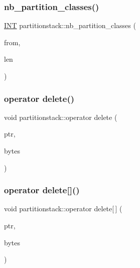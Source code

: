 \subsubsection{\texorpdfstring{nb\+\_\+partition\+\_\+classes()}{nb\_partition\_classes()}}
{\footnotesize\ttfamily \mbox{\hyperlink{galois_8h_a09fddde158a3a20bd2dcadb609de11dc}{I\+NT}} partitionstack\+::nb\+\_\+partition\+\_\+classes (\begin{DoxyParamCaption}\item[{\mbox{\hyperlink{galois_8h_a09fddde158a3a20bd2dcadb609de11dc}{I\+NT}}}]{from,  }\item[{\mbox{\hyperlink{galois_8h_a09fddde158a3a20bd2dcadb609de11dc}{I\+NT}}}]{len }\end{DoxyParamCaption})}

\mbox{\label{classpartitionstack_a18cdc060426cd39c320fccc084427d15}} 
\subsubsection{\texorpdfstring{operator delete()}{operator delete()}}
{\footnotesize\ttfamily void partitionstack\+::operator delete (\begin{DoxyParamCaption}\item[{void $\ast$}]{ptr,  }\item[{size\+\_\+t}]{bytes }\end{DoxyParamCaption})}

\mbox{\label{classpartitionstack_aee36e3ca53ed87b2a4e0e4834c53b697}} 
\subsubsection{\texorpdfstring{operator delete[]()}{operator delete[]()}}
{\footnotesize\ttfamily void partitionstack\+::operator delete\mbox{[}$\,$\mbox{]} (\begin{DoxyParamCaption}\item[{void $\ast$}]{ptr,  }\item[{size\+\_\+t}]{bytes }\end{DoxyParamCaption})}

